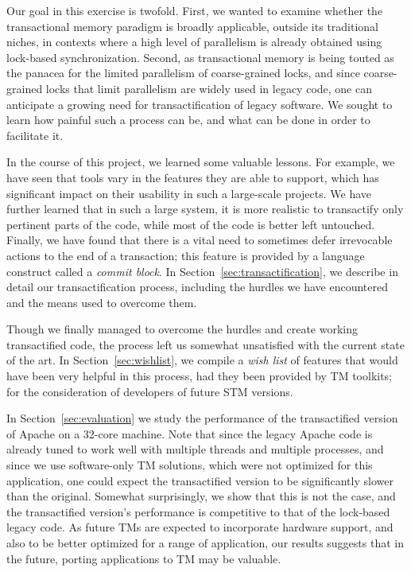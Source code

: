 \documentclass[preprint,11pt]{sigplanconf}
\begin{document}
Our goal in this exercise is twofold. First, we wanted to examine whether the transactional 
memory paradigm is broadly applicable, outside its traditional niches, in contexts where a 
high level of parallelism is already obtained using lock-based synchronization. 
%
Second, as transactional memory is being touted as the panacea for the limited parallelism 
of coarse-grained locks, and since coarse-grained locks that limit parallelism are widely used 
in legacy code, one can anticipate a growing need for transactification of legacy software. 
We sought to learn how painful such a process can be, and what can be done in order to 
facilitate it.

In the course of this project, we learned some valuable lessons.
For example, we have seen that tools vary in the features they are able
to support, which has significant impact on their usability in 
such a large-scale projects. We have further learned that in such a large
system, it is more realistic to transactify only pertinent parts of the code,
while most of the code is better left untouched. Finally, we have found
that there is a vital need to sometimes defer irrevocable actions to
the end of a transaction; this feature is provided by a language construct called 
a \emph{commit block}. In Section~\ref{sec:transactification}, 
we describe in detail our transactification
process, including the hurdles we have encountered and the means used to
overcome them.

Though we finally managed to overcome the hurdles and create working transactified 
code, the process left us somewhat unsatisfied with the current state of the art. 
In Section~\ref{sec:wishlist}, we compile a \emph{wish list} of features 
that would have been very helpful in this process, had they been provided
by TM toolkits; for the consideration of developers of future STM versions. 

In Section~\ref{sec:evaluation} we study the performance of the transactified 
version of Apache on a 32-core machine. 
Note that since the legacy Apache code is already 
tuned to work well with multiple threads and multiple processes, 
and since we use software-only TM solutions, which were not optimized for this 
application, one could expect the transactified version to be significantly
slower than the original.
Somewhat surprisingly, we show that this is not the case, and the 
transactified 
version's performance is competitive to that of the lock-based legacy code. 
As future TMs are expected to incorporate hardware support, and also 
to be better optimized for a range of application, our results 
suggests that in the future, porting applications to TM may be valuable.
\end{document}
